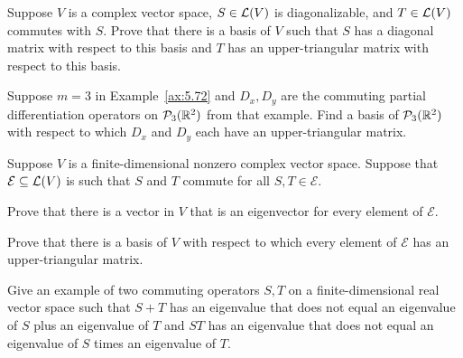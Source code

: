 \begin{exc}
\begin{exercise}
Suppose $V$ is a complex vector space, $S\in\mathcal{L}(V)$ is diagonalizable, and
$T\in\mathcal{L}(V)$ commutes with $S$. Prove that there is a basis of $V$ such that
$S$ has a diagonal matrix with respect to this basis and $T$ has an
upper-triangular matrix with respect to this basis.
\end{exercise}

\begin{exercise}
Suppose $m=3$ in Example~\ref{ax:5.72} and $D_x,D_y$ are the commuting partial
differentiation operators on $\mathcal{P}_3(\mathbb{R}^2)$ from that example. Find a basis of
$\mathcal{P}_3(\mathbb{R}^2)$ with respect to which $D_x$ and $D_y$ each have an
upper-triangular matrix.
\end{exercise}

\begin{exercise}
Suppose $V$ is a finite-dimensional nonzero complex vector space. Suppose that
$\mathcal{E}\subseteq\mathcal{L}(V)$ is such that $S$ and $T$ commute for all
$S,T\in\mathcal{E}$.
\begin{parts}
\item Prove that there is a vector in $V$ that is an eigenvector for every
  element of $\mathcal{E}$.
\item Prove that there is a basis of $V$ with respect to which every element of
  $\mathcal{E}$ has an upper-triangular matrix.
\end{parts}
\end{exercise}

\begin{exercise}
Give an example of two commuting operators $S,T$ on a finite-dimensional real
vector space such that $S+T$ has an eigenvalue that does not equal an
eigenvalue of $S$ plus an eigenvalue of $T$ and $ST$ has an eigenvalue that
does not equal an eigenvalue of $S$ times an eigenvalue of $T$.

\end{exercise}
\end{exc}

